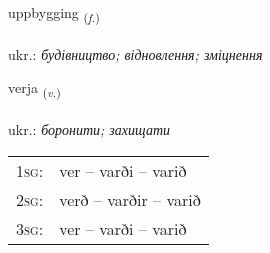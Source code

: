 \documentclass[frontgrid, backgrid]{flacards}\usepackage[]{graphicx}\usepackage[]{xcolor}
\begin{document}
{uppbygging \small{\textsubscript{(\textit{f.})}} \\[1ex] %
\textphonetic{[ʏhpɪciŋk]} \\
ukr.: \emph{будівництво; відновлення; зміцнення} \\  [2ex]
\renewcommand*{\arraystretch}{0.8}
}

\renewcommand{\flhead}{\vskip5pt \fboxsep=0pt {\small\bfseries\footnotesize Sagnorð | дієслово}}
\renewcommand{\fcfoot}{\vskip5pt \fboxsep=0pt \hspace{2pt}{\small\bfseries\footnotesize 1K}}

\renewcommand{\blhead}{\vskip5pt {\small\bfseries\footnotesize Sagnorð | дієслово }}
\renewcommand{\bcfoot}{\vskip5pt \hspace{2pt}{\small\bfseries\footnotesize 1K}}


{verja \small{\textsubscript{(\textit{v.})}} \\[1ex] %
\textphonetic{[vɛrja]} \\
ukr.: \emph{боронити; захищати} \\  [2ex]
\renewcommand*{\arraystretch}{0.8}
\begin{tabular}{p{1cm}l}
\textsc{1sg}: & ver -- varði -- varið \\ 
\textsc{2sg}: & verð -- varðir -- varið \\ 
\textsc{3sg}: & ver -- varði -- varið \\ 
\end{tabular}
}


\renewcommand{\flhead}{\vskip5pt \fboxsep=0pt {\small\bfseries\footnotesize Atviksorð | прислівник}}
\renewcommand{\fcfoot}{\vskip5pt \fboxsep=0pt \hspace{2pt}{\small\bfseries\footnotesize 1K}}
\end{document}

